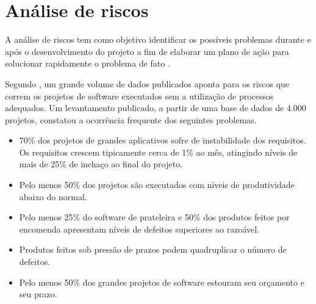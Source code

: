 {\section{Análise de riscos}
A análise de riscos tem como objetivo identificar os possíveis problemas durante e após o desenvolvimento do projeto a fim de elaborar um plano de ação para solucionar rapidamente o problema de fato \cite{schmitzanalise}.


Segundo \cite{de2003engenharia}, um grande volume de dados publicados aponta para os riscos que correm os projetos de software executados sem a utilização de processos adequados. Um levantamento publicado, a partir de
uma base de dados de 4.000 projetos, constatou a ocorrência frequente dos seguintes
problemas. 

\begin{itemize}
	\item 70\% dos projetos de grandes aplicativos sofre de instabilidade dos requisitos. Os requisitos
	crescem tipicamente cerca de 1\% ao mês, atingindo níveis de mais de 25\% de inchaço ao final
	do projeto.
	\item Pelo menos 50\% dos projetos são executados com níveis de produtividade abaixo do normal.
	\item Pelo menos 25\% do software de prateleira e 50\% dos produtos feitos por encomenda
	apresentam níveis de defeitos superiores ao razoável. 
	\item Produtos feitos sob pressão de prazos podem quadruplicar o número de defeitos.
	\item Pelo menos 50\% dos grandes projetos de software estouram seu orçamento e seu prazo. 
	
\end{itemize}


}
